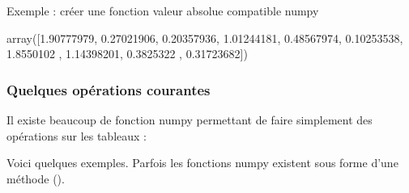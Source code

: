 \documentclass[letterpaper,10pt,english]{sphinxhowto}
\begin{document}
\sphinxAtStartPar
Exemple : créer une fonction valeur absolue compatible numpy

\begin{sphinxVerbatim}[commandchars=\\\{\}]
 
      
    \PYG{p}{[}\PYG{p}{]}  
     

    
\end{sphinxVerbatim}

\begin{sphinxVerbatim}[commandchars=\\\{\}]
array([1.90777979, 0.27021906, 0.20357936, 1.01244181, 0.48567974,
       0.10253538, 1.8550102 , 1.14398201, 0.3825322 , 0.31723682])
\end{sphinxVerbatim}


\subsubsection{Quelques opérations courantes}
\label{\detokenize{cours5_numpy_cours:quelques-operations-courantes}}
\sphinxAtStartPar
Il existe beaucoup de fonction numpy permettant de faire simplement des opérations sur les tableaux :

\sphinxAtStartPar
Voici quelques exemples. Parfois les fonctions numpy existent sous forme d’une méthode ().

\begin{sphinxVerbatim}[commandchars=\\\{\}]
   
  

 

\end{sphinxVerbatim}
\end{document}
